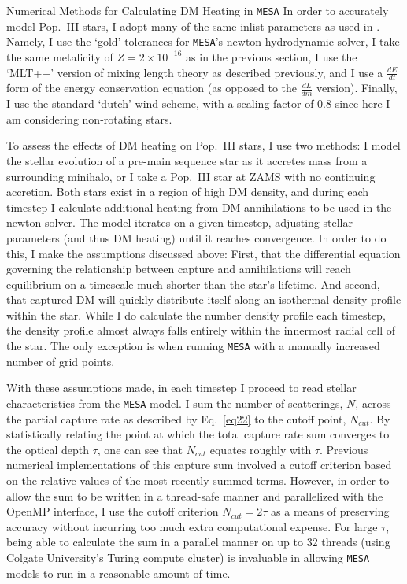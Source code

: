 \documentclass[a4paper,11pt]{article}
\begin{document}
\begin{section}{Numerical Methods for Calculating DM Heating in \texttt{MESA}}
    In order to accurately model Pop.~III stars, I adopt many of the same inlist parameters as used in \cite{Windhorst:2019}.
    Namely, I use the `gold' tolerances for \texttt{MESA}'s newton hydrodynamic solver, I take the same metalicity of $Z = 2 \times 10^{-16}$ as in the previous section, I use the `MLT++' version of mixing length theory as described previously, and I use a $\frac{dE}{dt}$ form of the energy conservation equation (as opposed to the $\frac{dL}{dm}$ version).
    Finally, I use the standard `dutch' wind scheme, with a scaling factor of 0.8 since here I am considering non-rotating stars.

    To assess the effects of DM heating on Pop.~III stars, I use two methods: I model the stellar evolution of a pre-main sequence star as it accretes mass from a surrounding minihalo, or I take a Pop.~III star at ZAMS with no continuing accretion.
    Both stars exist in a region of high DM density, and during each timestep I calculate additional heating from DM annihilations to be used in the newton solver.
    The model iterates on a given timestep, adjusting stellar parameters (and thus DM heating) until it reaches convergence.
    In order to do this, I make the assumptions discussed above: First, that the differential equation governing the relationship between capture and annihilations will reach equilibrium on a timescale much shorter than the star's lifetime.
    And second, that captured DM will quickly distribute itself along an isothermal density profile within the star.
    While I do calculate the number density profile each timestep, the density profile almost always falls entirely within the innermost radial cell of the star.
    The only exception is when running \texttt{MESA} with a manually increased number of grid points.

    With these assumptions made, in each timestep I proceed to read stellar characteristics from the \texttt{MESA} model. I sum the number of scatterings, $N$, across the partial capture rate as described by Eq.~\ref{eq22} to the cutoff point, $N_{cut}$.
    By statistically relating the point at which the total capture rate sum converges to the optical depth $\tau$, one can see that $N_{cut}$ equates roughly with $\tau$.
    Previous numerical implementations of this capture sum involved a cutoff criterion based on the relative values of the most recently summed terms.
    However, in order to allow the sum to be written in a thread-safe manner and parallelized with the OpenMP interface, I use the cutoff criterion $N_{cut} = 2\tau$ as a means of preserving accuracy without incurring too much extra computational expense.
    For large $\tau$, being able to calculate the sum in a parallel manner on up to 32 threads (using Colgate University's Turing compute cluster) is invaluable in allowing \texttt{MESA} models to run in a reasonable amount of time.


\end{section}
\end{document}
